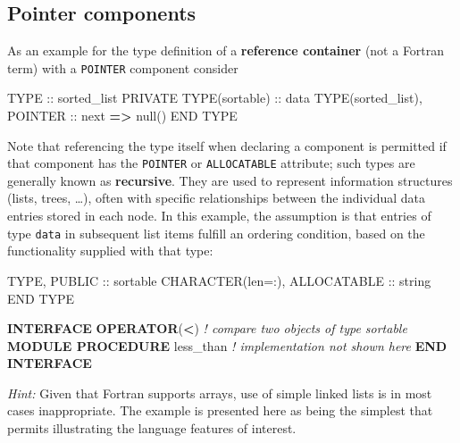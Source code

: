 \documentclass[
  paper=a4,
  ,captions=tableheading
]{scrartcl}
\newenvironment{Shaded}{\begin{snugshade}}{\end{snugshade}}
\newcommand{\CommentTok}[1]{\textcolor[rgb]{0.56,0.35,0.01}{\textit{#1}}}
\newcommand{\DataTypeTok}[1]{\textcolor[rgb]{0.13,0.29,0.53}{#1}}
\newcommand{\KeywordTok}[1]{\textcolor[rgb]{0.13,0.29,0.53}{\textbf{#1}}}
\newcommand{\NormalTok}[1]{#1}
\newcommand{\OperatorTok}[1]{\textcolor[rgb]{0.81,0.36,0.00}{\textbf{#1}}}
\begin{document}
\subsection{Pointer components}\label{pointer-components}

As an example for the type definition of a \textbf{reference container}
(not a Fortran term) with a \texttt{POINTER} component consider

\begin{Shaded}
\begin{Highlighting}[]
\DataTypeTok{TYPE} \DataTypeTok{::}\NormalTok{ sorted\_list}
   \DataTypeTok{PRIVATE}
   \DataTypeTok{TYPE(sortable)} \DataTypeTok{::}\NormalTok{ data}
   \DataTypeTok{TYPE(sorted\_list)}\NormalTok{, }\DataTypeTok{POINTER} \DataTypeTok{::}\NormalTok{ next }\KeywordTok{=}\OperatorTok{\textgreater{}}\NormalTok{ null()}
\DataTypeTok{END TYPE}
\end{Highlighting}
\end{Shaded}

Note that referencing the type itself when declaring a component is
permitted if that component has the \texttt{POINTER} or
\texttt{ALLOCATABLE} attribute; such types are generally known as
\textbf{recursive}. They are used to represent information structures
(lists, trees, \ldots), often with specific relationships between the
individual data entries stored in each node. In this example, the
assumption is that entries of type \texttt{data} in subsequent list
items fulfill an ordering condition, based on the functionality supplied
with that type:

\begin{Shaded}
\begin{Highlighting}[]
\DataTypeTok{TYPE}\NormalTok{, }\DataTypeTok{PUBLIC} \DataTypeTok{::}\NormalTok{ sortable}
   \DataTypeTok{CHARACTER(len=:)}\NormalTok{, }\DataTypeTok{ALLOCATABLE} \DataTypeTok{::}\NormalTok{ string}
\DataTypeTok{END TYPE}

\KeywordTok{INTERFACE} \KeywordTok{OPERATOR}\NormalTok{(}\OperatorTok{\textless{}}\NormalTok{)          }\CommentTok{! compare two objects of type sortable}
   \KeywordTok{MODULE PROCEDURE}\NormalTok{ less\_than  }\CommentTok{! implementation not shown here}
\KeywordTok{END INTERFACE}
\end{Highlighting}
\end{Shaded}

\emph{Hint:} Given that Fortran supports arrays, use of simple linked
lists is in most cases inappropriate. The example is presented here as
being the simplest that permits illustrating the language features of
interest.
\end{document}
